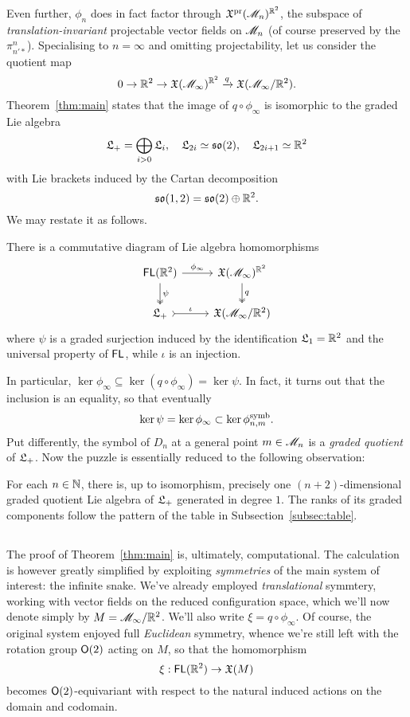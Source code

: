 Even further, $\phi_n$ does in fact factor through $\mathfrak{X}^{\operatorname{\mathrm{pr}}}(\mathscr{M}_n)^{{\mathbb{R}}^2}$, the
subspace of \emph{translation-invariant} projectable vector fields on $\mathscr{M}_n$ (of course preserved by the $\pi^n_{n'*}$).
Specialising to $n=\infty$ and omitting projectability, let us consider the quotient map
\[ 0 \to {\mathbb{R}}^2 \to \mathfrak{X}(\mathscr{M}_\infty)^{{\mathbb{R}}^2}\xrightarrow{q} \mathfrak{X}(\mathscr{M}_\infty/{\mathbb{R}}^2). \]
Theorem~\ref{thm:main} states that the image of $q \circ \phi_\infty$ is isomorphic to
the graded Lie algebra
\[ \mathfrak{L}_+ = \bigoplus_{i>0} \mathfrak{L}_i,\quad \mathfrak{L}_{2i} \simeq \mathfrak{so}(2),\quad \mathfrak{L}_{2i+1} \simeq {\mathbb{R}}^2 \]
with Lie brackets induced by the Cartan decomposition 
\[ \mathfrak{so}(1,2) = \mathfrak{so}(2) \oplus {\mathbb{R}}^2. \]
We may restate it as follows.
\begin{thm*}
There is a commutative diagram of Lie algebra homomorphisms
\[\begin{tikzcd}
        \FL(\RR^2) \arrow[d, "\psi", two heads] \arrow[r,"\phi_\infty"] & \XX(\sM_\infty)^{\RR^2} \arrow[d,"q",two heads] \\
        \fL_+ \arrow[r,"\iota",rightarrowtail] & \XX(\sM_\infty/\RR^2) 
\end{tikzcd}\]
where $\psi$ is a graded surjection induced by the identification $\mathfrak{L}_1={\mathbb{R}}^2$ and the universal property of $\operatorname{\mathsf{FL}}$,
while $\iota$ is an injection. 
\end{thm*}

In particular, $\ker \phi_\infty \subseteq \ker(q \circ \phi_\infty) = \ker\psi$. In fact, it turns out that
the inclusion is an equality, so that eventually
\[ \ker\psi = \ker\phi_\infty \subset \ker\phi_{n,m}^{\operatorname{\mathrm{symb}}}. \]
Put differently, the symbol of $D_n$ at a general point $m \in \mathscr{M}_n$
is a \emph{graded quotient} of $\mathfrak{L}_+$. Now the puzzle is essentially reduced to the 
following observation:
\begin{prop*} For each $n \in {\mathbb{N}}$, there is, up to isomorphism, precisely one $(n+2)$-dimensional graded quotient 
        Lie algebra of $\mathfrak{L}_+$ generated in degree $1$. The ranks of its graded components follow the
        pattern of the table in Subsection~\ref{subsec:table}.
\end{prop*}

\subsection{}
The proof of Theorem~\ref{thm:main} is, ultimately, computational. The calculation is however greatly
simplified by exploiting \emph{symmetries} of the main system of interest: the infinite snake. We've already
employed \emph{translational} symmtery, working with vector fields on the reduced configuration space, which
we'll now denote simply by $M=\mathscr{M}_\infty /{\mathbb{R}}^2$. We'll also write $\xi = q \circ\phi_\infty$.
Of course, the original system enjoyed full \emph{Euclidean}
symmetry, whence we're still left with the rotation group $\mathsf{O}(2)$ acting on $M$, so that the
homomorphism
\[ \xi : \operatorname{\mathsf{FL}}({\mathbb{R}}^2) \to \mathfrak{X}(M) \]
becomes $\mathsf{O}(2)$-equivariant with respect to the natural induced actions on the domain and codomain.

